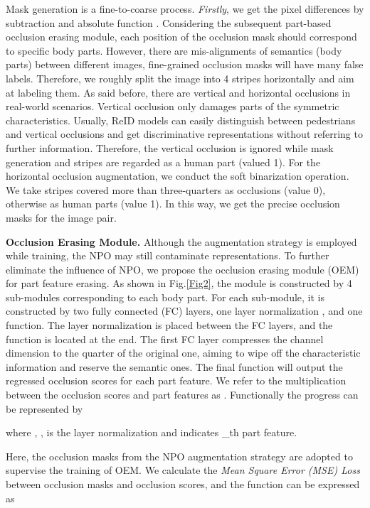 \documentclass[10pt,twocolumn,letterpaper]{article}
\begin{document}
Mask generation is a fine-to-coarse process. \emph{Firstly}, we get the pixel differences by subtraction and absolute function . 
Considering the subsequent part-based occlusion erasing module, each position of the occlusion mask should correspond to specific body parts. 
However, there are mis-alignments of semantics (body parts) between different images, fine-grained occlusion masks will have many false labels. Therefore, we roughly split the image into 4 stripes horizontally and aim at labeling them.
As said before, there are vertical and horizontal occlusions in real-world scenarios. 
Vertical occlusion only damages parts of the symmetric characteristics. Usually, ReID models can easily distinguish between pedestrians and vertical occlusions and get discriminative representations without referring to further information. Therefore, the vertical occlusion is ignored while mask generation and stripes are regarded as a human part (valued 1).
For the horizontal occlusion augmentation, we conduct the soft binarization operation. We take stripes covered more than three-quarters as occlusions (value 0), otherwise as human parts (value 1). In this way, we get the precise occlusion masks for the image pair.


\textbf{Occlusion Erasing Module.}
Although the augmentation strategy is employed while training, the NPO may still contaminate representations. To further eliminate the influence of NPO, we propose the occlusion erasing module (OEM) for part feature erasing. 
As shown in Fig.\ref{Fig2}, the module is constructed by 4 sub-modules corresponding to each body part. For each sub-module, it is constructed by two fully connected (FC) layers, one layer normalization \cite{ba2016layer}, and one  function. The layer normalization is placed between the FC layers, and the  function is located at the end. The first FC layer compresses the channel dimension to the quarter of the original one, aiming to wipe off the characteristic information and reserve the semantic ones. The final  function will output the regressed occlusion scores  for each part feature. We refer to the multiplication between the occlusion scores and part features as . Functionally the progress can be represented by

where , ,  is the layer normalization and  indicates \_th part feature. 


Here, the occlusion masks from the NPO augmentation strategy are adopted to supervise the training of OEM. We calculate the \emph{Mean Square Error (MSE) Loss} between occlusion masks and occlusion scores, and the function can be expressed as
\end{document}
